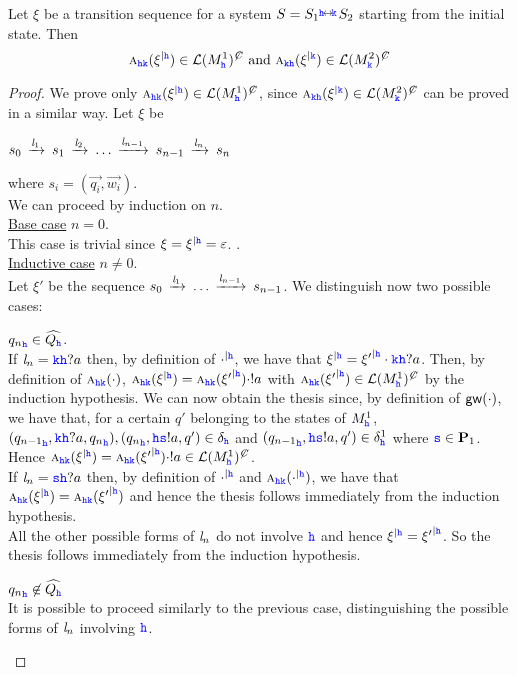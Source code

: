 \begin{lemma}
\label{lem:inlangs}
Let $\xi$ be a transition sequence for a system
$S={S_{1}}\connect{\HH}{\KK} {S_{2}}$ starting from the initial state. Then
$$\symb{\HH\KK}{\restrictup{\xi}{\HH}}\in\lang{M^1_\HH}^\mC \text{ and }
\symb{\KK\HH}{\restrictup{\xi}{\KK}}\in\lang{M^2_\KK}^\mC$$
\end{lemma}
\begin{proof}
We prove only $\symb{\HH\KK}{\restrictup{\xi}{\HH}}\in\lang{M^1_\HH}^\mC$, since 
$\symb{\KK\HH}{\restrictup{\xi}{\KK}}\in\lang{M^2_\KK}^\mC$ can be proved in a similar way.
Let $\xi$ be\\
\centerline{
$s_0\lts{\elle_1}s_1\lts{\elle_2} \ldots \lts{\elle_{n-1}}s_{n-1}\lts{\elle_n}s_n$
}
where $s_i=({\vec{q_i}},{\vec{w_i}})$.\\
We can proceed by  induction on $n$.\\
\underline{Base case} $n=0$. \\
This case is trivial since $\xi = \restrictup{\xi}{\HH}=\varepsilon$. .\\
\underline{Inductive case} $n\neq 0$.\\
Let $\xi'$ be the sequence $s_0\lts{\elle_1} \ldots \lts{\elle_{n-1}}s_{n-1}$.
We distinguish now two possible cases:
\begin{description}
\item 
${q_n}_\HH\in\widehat{Q_\HH}$.\\
If  $\elle_n = \KK\HH?a$ then, by definition of $\restrictup{\cdot}{\HH}$,
we have that $\restrictup{\xi}{\HH}= \restrictup{\xi'}{\HH}\cdot\KK\HH?a$. 
Then, by definition of $\symb{\HH\KK}{\cdot}$, 
$\symb{\HH\KK}{\restrictup{\xi}{\HH}}=\symb{\HH\KK}{\restrictup{\xi'}{\HH}}\cdot !a$ with
$\symb{\HH\KK}{\restrictup{\xi'}{\HH}}\in\lang{M^1_\HH}^\mC$ by the induction hypothesis.
We can now obtain the thesis since, by definition of $\gateway{\cdot}$, we have that, for a certain $q'$ belonging to the states of $M^1_\HH$, $({q_{n-1}}_\HH, \KK\HH?a, {q_n}_\HH), ({q_{n}}_\HH, \HH\tts!a, q') \in \delta_\HH$ and
 $({q_{n-1}}_\HH, \HH\tts!a, q') \in \delta^1_\HH$
 where $\tts \in \roles_1$. Hence $\symb{\HH\KK}{\restrictup{\xi}{\HH}} = \symb{\HH\KK}{\restrictup{\xi'}{\HH}}\cdot !a
\in \lang{M^1_\HH}^\mC$. \\
 If  $\elle_n = \tts\HH?a$ then, by definition of $\restrictup{\cdot}{\HH}$ and $\symb{\HH\KK}{\restrictup{\cdot}{\HH}}$, we have that $\symb{\HH\KK}{\restrictup{\xi}{\HH}}=\symb{\HH\KK}{\restrictup{\xi'}{\HH}}$
 and hence the thesis follows immediately from the induction hypothesis.\\
 All the other possible forms of $\elle_n$ do not involve $\HH$ and hence $\restrictup{\xi}{\HH}=\restrictup{\xi'}{\HH}$.
 So the thesis follows immediately from the induction hypothesis.
\item
${q_n}_\HH\not\in\widehat{Q_\HH}$\\
It is possible to proceed similarly to the previous case, distinguishing the possible forms of 
$\elle_n$ involving $\HH$.
\end{description}
\end{proof}



